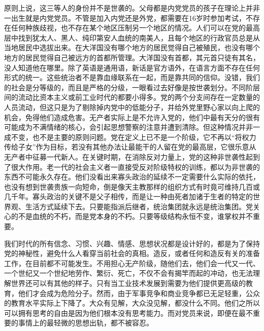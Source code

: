 原则上说，这三等人的身份并不是世袭的。父母都是内党党员的孩子在理论上并非一出生就是内党党员。不管是加入内党还是外党，都需要在16岁时参加考试，不存在任何种族歧视，也不存在某个地区压制另一个地区的情况。人们可以在党的最高层中找到犹太人、黑人、纯印第安人血统的南美人，且每个地区的行政官员总是从当地居民中选拔出来。在大洋国没有哪个地方的居民觉得自己被殖民，也没有哪个地方的居民觉得自己被远方的首都所管理。大洋国没有首都，其元首只徒有其名，没人知道他在哪里。除了英语是通用语，新话是官方语外，在语言方面不存在任何形式的统一。这些统治者不是靠血缘联系在一起，而是靠共同的信仰。没错，我们的社会是分等级的，而且是严格的分级，一眼看过去好像是按世袭划分。不同阶层间的流动比资本主义或前工业时代的都要小得多。党的两个分支间存在一定数量的人员流动，但这只是为了剔除掉内党中的低能分子，并给外党里野心家以向上爬的机会，免得他们造成危害。无产者实际上是不允许入党的，他们中最有天分的很有可能成为不满情绪的核心，会引起思想警察的注意并遭到清除。但这种情况并非一成不变，也不是主要的原则问题。党在定义上已不是一个阶级，它不再以``将权力传给子女''作为目标，若没有其他办法让最能干的人留在党的最高层，它很乐意从无产者中征募一代新人。在关键时期，在消除反对力量上，党的这种非世袭性起到了很大作用。老一代的社会主义者一直接受反对阶级特权的训练，都以为非世袭的东西不可能永久存在。他们没看出来寡头政治的延续不一定需要什么实际的依托，也没有想到世袭贵族一向短命，倒是像天主教那样的组织方式有时竟可维持几百或几千年。寡头政治的关键不是父子相传，而是让一种由死者加诸于生者的特定的世界观、生活方式延续下去。只要能指派后继者，统治集团就永远是统治集团。党关心的不是血统的不朽，而是党本身的不朽。只要等级结构永恒不变，谁掌权并不重要。

我们时代的所有信念、习惯、兴趣、情感、思想状况都是设计好的，都是为了保持党的神秘性，避免什么人看穿当前社会的真相。造反，或者任何和造反有关的准备工作，在目前都不可能发生。不用担心无产阶级，随他们去，他们会一代又一代、一个世纪又一个世纪地劳作、繁衍、死亡，不仅不会有揭竿而起的冲动，也无法理解世界还可以有其他的样子。只有当工业技术发展到需要为他们提供更高级的教育，他们才会成为危险分子。然而，由于军事竞争和商业竞争都已无足轻重，公众的教育水平实际上下降了。大众有见解，大众没见解，都没什么不同。他们之所以可以拥有思考的自由是因为他们根本没有思考能力。而对党员来说，即便在最不重要的事情上的最轻微的思想出轨，都不被容忍。

